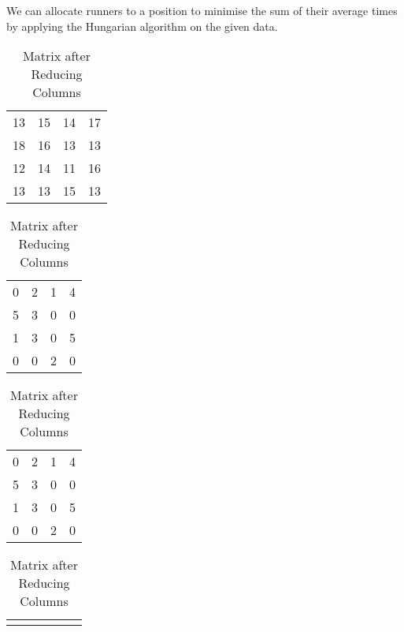 \begin{subquestions}
We can allocate runners to a position to minimise the sum of their average times by applying the Hungarian algorithm on the given data.
\begin{table}[!h]
	\begin{minipage}{0.3\textwidth}
		\centering
		\begin{tabular}{cccc}
			13 & 15 & 14 & 17 \\
			18 & 16 & 13 & 13 \\
			12 & 14 & 11 & 16 \\
			13 & 13 & 15 & 13 \\
		\end{tabular}
		\captionsetup{width=1.1\linewidth}
		\caption*{Matrix From question}
	\end{minipage}
	\hspace{20pt}
	\begin{minipage}{0.3\textwidth}
		\centering
		\begin{tabular}{cccc}
			0 & 2 & 1 & 4 \\
			5 & 3 & 0 & 0 \\
			1 & 3 & 0 & 5 \\
			0 & 0 & 2 & 0 \\
		\end{tabular}
		\captionsetup{width=1.1\linewidth}
		\caption*{Matrix after Reducing Rows}
	\end{minipage}
	\hspace{20pt}
	\begin{minipage}{0.3\textwidth}
		\centering
		\begin{tabular}{cccc}
			0 & 2 & 1 & 4 \\
			5 & 3 & 0 & 0 \\
			1 & 3 & 0 & 5 \\
			0 & 0 & 2 & 0 \\
		\end{tabular}
		\captionsetup{width=1.1\linewidth}
		\caption*{Matrix after Reducing Columns} 
	\end{minipage}
	\vspace{20pt} 
	\begin{minipage}{0.3\textwidth}
		\centering
		\begin{tabular} {cccccc}
			&   &        &\hspace{-3.25mm} \hvs{v1}      &   &                       \\ 

\end{tabular}
\end{minipage}
\end{table}
\end{subquestions}
